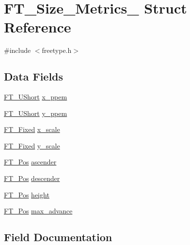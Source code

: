 \hypertarget{struct_f_t___size___metrics__}{}\section{F\+T\+\_\+\+Size\+\_\+\+Metrics\+\_\+ Struct Reference}
\label{struct_f_t___size___metrics__}


{\ttfamily \#include $<$freetype.\+h$>$}

\subsection*{Data Fields}
\begin{DoxyCompactItemize}
\item 
\hyperlink{fttypes_8h_a937f6c17cf5ffd09086d8610c37b9f58}{F\+T\+\_\+\+U\+Short} \hyperlink{struct_f_t___size___metrics___abb42b175a3450e9d8b84483f166d6c8a}{x\+\_\+ppem}
\item 
\hyperlink{fttypes_8h_a937f6c17cf5ffd09086d8610c37b9f58}{F\+T\+\_\+\+U\+Short} \hyperlink{struct_f_t___size___metrics___abcdb70cb9e39a74679bc39c07f3275f7}{y\+\_\+ppem}
\item 
\hyperlink{fttypes_8h_a5f5a679cc09f758efdd0d1c5feed3c3d}{F\+T\+\_\+\+Fixed} \hyperlink{struct_f_t___size___metrics___a5e92028bb9881e107a6fb75d557eaff1}{x\+\_\+scale}
\item 
\hyperlink{fttypes_8h_a5f5a679cc09f758efdd0d1c5feed3c3d}{F\+T\+\_\+\+Fixed} \hyperlink{struct_f_t___size___metrics___a1f8b1cb3538b9920127f721dd061379d}{y\+\_\+scale}
\item 
\hyperlink{ftimage_8h_af5f230f4b253d4c7715fd2e595614c90}{F\+T\+\_\+\+Pos} \hyperlink{struct_f_t___size___metrics___ab5fde60a2661d7b774f61c264a2a6070}{ascender}
\item 
\hyperlink{ftimage_8h_af5f230f4b253d4c7715fd2e595614c90}{F\+T\+\_\+\+Pos} \hyperlink{struct_f_t___size___metrics___a9b2ca3a4391803e8721ed99eb9953d52}{descender}
\item 
\hyperlink{ftimage_8h_af5f230f4b253d4c7715fd2e595614c90}{F\+T\+\_\+\+Pos} \hyperlink{struct_f_t___size___metrics___ae3361e264fb8a9e669f118bdb244439b}{height}
\item 
\hyperlink{ftimage_8h_af5f230f4b253d4c7715fd2e595614c90}{F\+T\+\_\+\+Pos} \hyperlink{struct_f_t___size___metrics___ac315a7a834ac1a57c7169ce021718958}{max\+\_\+advance}
\end{DoxyCompactItemize}


\subsection{Field Documentation}
\mbox{\label{struct_f_t___size___metrics___ab5fde60a2661d7b774f61c264a2a6070}} 
